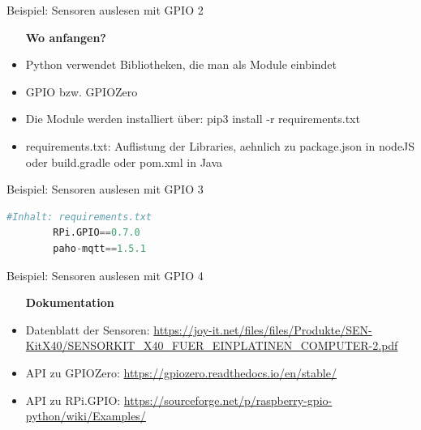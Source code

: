 \begin{frame}{Beispiel: Sensoren auslesen mit GPIO 2}
    \begin{itemize}
    \setlength{\itemindent}{1in}
     \item [\textbf{ Wo anfangen?}]
    \end{itemize}
    \begin{itemize}
        \item  Python verwendet Bibliotheken, die man als Module einbindet
        \item  GPIO bzw. GPIOZero
        \item  Die Module werden installiert über:  pip3 install -r requirements.txt
        \item  requirements.txt: Auflistung der Libraries, aehnlich zu package.json in nodeJS oder build.gradle oder pom.xml in Java
     \end{itemize}
\end{frame}

\begin{frame}[fragile]{Beispiel: Sensoren auslesen mit GPIO 3}
    \begin{lstlisting}[language=Python, gobble=8]
        #Inhalt: requirements.txt
        RPi.GPIO==0.7.0
        paho-mqtt==1.5.1
    \end{lstlisting}
\end{frame}

\begin{frame}{Beispiel: Sensoren auslesen mit GPIO 4}
    \begin{itemize}
    \setlength{\itemindent}{1.0in}
     \item [\textbf{ Dokumentation}]
    \end{itemize}

    \begin{itemize}
        \item Datenblatt der Sensoren: \url{https://joy-it.net/files/files/Produkte/SEN-KitX40/SENSORKIT_X40_FUER_EINPLATINEN_COMPUTER-2.pdf}
        \item API zu GPIOZero: \url{https://gpiozero.readthedocs.io/en/stable/}
		\item API zu RPi.GPIO: \url{https://sourceforge.net/p/raspberry-gpio-python/wiki/Examples/}
     \end{itemize}
\end{frame}

